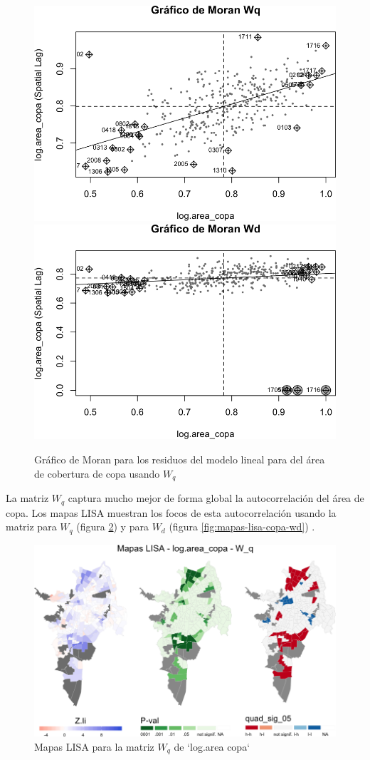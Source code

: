 \documentclass[12pt,]{book}
\begin{document}
\begin{figure}
\includegraphics[width=0.49\linewidth]{tesis-unigis_files/figure-latex/moranplot-copa-w-1} \includegraphics[width=0.49\linewidth]{tesis-unigis_files/figure-latex/moranplot-copa-w-2} \caption{Gráfico de Moran para los residuos del modelo lineal para del área de cobertura de copa usando $W_{q}$}\label{fig:moranplot-copa-w}
\end{figure}

La matriz \(W_q\) captura mucho mejor de forma global la autocorrelación
del área de copa. Los mapas LISA muestran los focos de esta
autocorrelación usando la matriz para \(W_q\) (figura
\ref{fig:mapas-lisa-copa-wq}) y para \(W_d\) (figura
\ref{fig:mapas-lisa-copa-wd}) .

\begin{figure}
\includegraphics[width=1\linewidth]{tesis-unigis_files/figure-latex/mapas-lisa-copa-wq-1} \caption{Mapas LISA para la matriz $W_q$ de `log.area copa`}\label{fig:mapas-lisa-copa-wq}
\end{figure}
\end{document}
